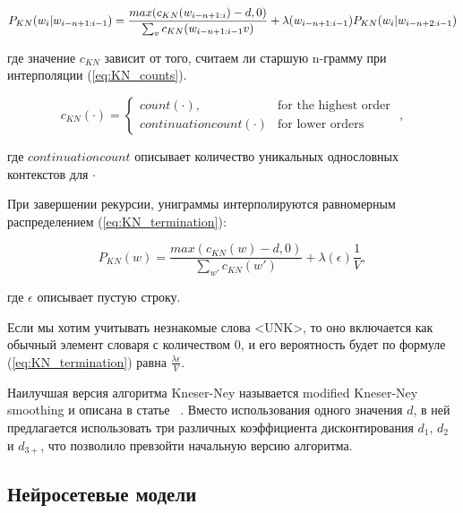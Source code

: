 \begin{equation}
	P_{KN}(w_i|w_{i-n+1:i-1}) = \frac{max(c_{KN}(w_{i-n+1:i})-d, 0)}{\sum_v{c_{KN}(w_{i-n+1:i-1}v)}} + \\ \lambda(w_{i-n+1:i-1})P_{KN}(w_i|w_{i-n+2:i-1})
	\label{eq:i_actualy_once_coded_this_shit}
\end{equation}
\begin{explanation}
	где значение $c_{KN}$ зависит от того, считаем ли старшую n-грамму при \\ интерполяции (\ref{eq:KN_counts}).
\end{explanation}
\begin{equation}
	c_{KN}(\cdot) = \begin{cases} 
		count(\cdot), & \mbox{for the highest order }\\ 
		continuationcount(\cdot) & \mbox{for lower orders}
	\end{cases},
	\label{eq:KN_counts}
\end{equation}
\begin{explanation}
	где $continuationcount$ описывает количество уникальных однословных \\ контекстов для $\cdot$
\end{explanation}

При завершении рекурсии, униграммы интерполируются равномерным распределением (\ref{eq:KN_termination}):

\begin{equation}
	P_{KN}(w) = \frac{max(c_{KN}(w) - d, 0)}{\sum_{w'}{c_{KN}(w')}} + \lambda(\epsilon)\frac{1}{V},
	\label{eq:KN_termination}
\end{equation}
\begin{explanation}
	где $\epsilon$ описывает пустую строку.
\end{explanation}

Если мы хотим учитывать незнакомые слова $\text{<UNK>}$, то оно включается как обычный элемент словаря с количеством 0, и его вероятность будет по формуле (\ref{eq:KN_termination}) равна $\frac{\lambda{\epsilon}}{V}$.

Наилучшая версия алгоритма Kneser-Ney называется modified Kneser-Ney smoothing и описана в статье ~\cite{modified-kneser-ney}. Вместо использования одного значения $d$, в ней предлагается использовать три различных коэффициента дисконтирования $d_1$, $d_2$ и $d_{3+}$, что позволило превзойти начальную версию алгоритма. ~\cite{n_grams}

\subsection{Нейросетевые модели}
\label{sub:domain:neural}

